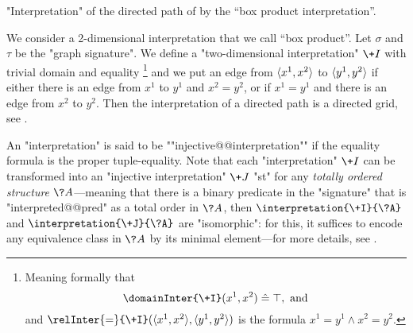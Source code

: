 \begin{marginfigure}
	\centering
	\caption{
		\AP\label{fig:interpretation-path-into-grid}
		"Interpretation" of the directed path of
		 by the
		``box product interpretation''.
	}
\end{marginfigure}
\begin{example}
	We consider a 2-dimensional interpretation that we call ``box product''.
	Let $\sigma$ and $\tau$ be the "graph signature".
	We define a "two-dimensional interpretation" $\+I$ with trivial domain and equality%
	\footnote{Meaning formally that \[\domainInter{\+I}(x^1,x^2) \defeq \top,\text{ and}\]
	and $\relInter{=}{\+I}(\tup{x^1,x^2}, \tup{y^1,y^2})$ is
	the formula $x^1 = y^1 \land x^2 = y^2$.}
	and we put an edge from $\langle x^1,x^2\rangle$ to $\langle y^1,y^2\rangle$ if either
	there is an edge from $x^1$ to $y^1$ and $x^2 = y^2$, or if
	$x^1 = y^1$ and there is an edge from $x^2$ to $y^2$.
	Then the interpretation of a directed path is a directed grid,
	see .
\end{example}

An "interpretation" is said to be \AP""injective@@interpretation"" if the equality formula
is the proper tuple-equality.
Note that each "interpretation" $\+I$ can be transformed into
an "injective interpretation" $\+J$ "st" 
for any \emph{totally ordered structure} $\?A$---meaning that there is a binary predicate
in the "signature" that is "interpreted@@pred" as a total order in $\?A$,
then $\interpretation{\+I}{\?A}$ and $\interpretation{\+J}{\?A}$ are "isomorphic":
for this, it suffices to encode any equivalence class in $\?A$ by its minimal element---for more
details, see .


